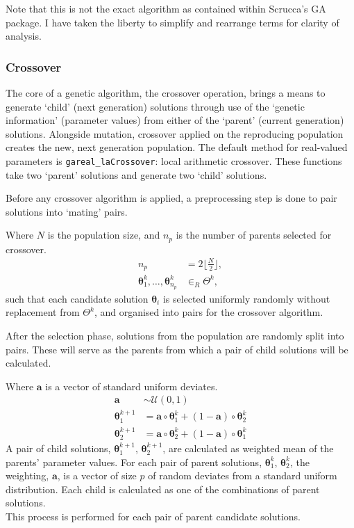 \documentclass[
  a4paper,
]{article}
\newcommand{\B}[1]{\boldsymbol{#1}}
\newcommand{\+}{\phantom{-}}
\begin{document}
Note that this is not the exact algorithm as contained within Scrucca's
GA package. I have taken the liberty to simplify and rearrange terms for
clarity of analysis.

\subsubsection{\texorpdfstring{\textbf{Crossover}}{Crossover}}\label{crossover}

The core of a genetic algorithm, the crossover operation, brings a means
to generate `child' (next generation) solutions through use of the
`genetic information' (parameter values) from either of the `parent'
(current generation) solutions. Alongside mutation, crossover applied on
the reproducing population creates the new, next generation population.
The default method for real-valued parameters is
\texttt{gareal\_laCrossover}: local arithmetic crossover. These
functions take two `parent' solutions and generate two `child'
solutions.

Before any crossover algorithm is applied, a preprocessing step is done
to pair solutions into `mating' pairs.

Where \(N\) is the population size, and \(n_p\) is the number of parents
selected for crossover. \[
\begin{aligned}
n_p &= 2\lfloor \frac{N}2\rfloor ,
\\
\B\theta^k_1, \dots, \B\theta^k_{n_p}  &\in_R \Theta^k,
\end{aligned}
\] such that each candidate solution \(\B\theta_i\) is selected
uniformly randomly without replacement from \(\Theta^k\), and organised
into pairs for the crossover algorithm.

After the selection phase, solutions from the population are randomly
split into pairs. These will serve as the parents from which a pair of
child solutions will be calculated.

\begin{tcolorbox}[title=Local arithmetic crossover: \texttt{gareal\_laCrossover()}]
Where $\B a$ is a vector of standard uniform deviates.
$$
\begin{aligned}
\B a &\sim \mathcal U\!\left(0,1\right)\\
\B\theta_1^{k+1} &= \B a \circ \B\theta_1^k +\left(1-\B a\right)\circ\B\theta_2^k \\
\B\theta_2^{k+1} &= \B a \circ \B\theta_2^k +\left(1-\B a\right)\circ\B\theta_1^k
\end{aligned}
$$
A pair of child solutions, $\B\theta_1^{k+1}$, $\B\theta_2^{k+1}$, are calculated as weighted mean of the parents' parameter values. For each pair of parent solutions, $\B\theta^k_1$, $\B\theta^k_2$, the weighting, $\B a$, is a vector of size $p$ of random deviates from a standard uniform distribution. Each child is calculated as one of the combinations of parent solutions.\\

This process is performed for each pair of parent candidate solutions.
\end{tcolorbox}
\end{document}
